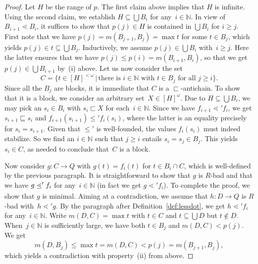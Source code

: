 \documentclass{amsart}
\numberwithin{theorem}{section}
\theoremstyle{definition}
\newcommand\ledot{\mathrel{\ensurestackMath{%
  \stackengine{-.5ex}{\lessdot}{-}{U}{c}{F}{F}{S}}}}
\begin{document}
\begin{proof}
Let $H$ be the range of $p$. The first claim above implies that $H$ is infinite. Using the second claim, we establish $H\subseteq\bigcup B_i$ for any~$i\in\mathbb N$. In view of $B_{i+1}\lessdot B_i$, it suffices to show that $p(j)\in H$ is contained in $\bigcup B_i$ for $i\geq j$. First note that we have $p(j)=m(B_{j+1},B_j)=\max t$ for some $t\in B_j$, which yields $p(j)\in t\subseteq\bigcup B_j$. Inductively, we assume $p(j)\in\bigcup B_i$ with~$i\geq j$. Here the latter ensures that we have $p(j)\leq p(i)=m(B_{i+1},B_i)$, so that we get $p(j)\in\bigcup B_{i+1}$ by~(i) above. Let us now consider the set
\begin{equation*}
    C=\{t\in[H]^{<\omega}\,|\,\text{there is $i\in\mathbb N$ with $t\in B_j$ for all~$j\geq i$}\}.
\end{equation*}
Since all the $B_j$ are blocks, it is immediate that $C$ is a $\sqsubset$-antichain. To show that it is a block, we consider an arbitrary set~$X\in[H]^\omega$. Due to $H\subseteq\bigcup B_i$, we may pick an $s_i\in B_i$ with $s_i\sqsubset X$ for each~$i\in\mathbb N$. Since we have $f_{i+1}\lessdot' f_i$, we get $s_{i+1}\sqsubseteq s_i$ and $f_{i+1}(s_{i+1})\leq'f_i(s_i)$, where the latter is an equality precisely for $s_i=s_{i+1}$. Given that $\leq'$ is well-founded, the values $f_i(s_i)$ must indeed stabilize. So we find an $i\in\mathbb N$ such that $j\geq i$ entails $s_i=s_j\in B_j$. This yields $s_i\in C$, as needed to conclude that~$C$ is a block.

Now consider $g:C\to Q$ with $g(t)=f_i(t)$ for $t\in B_i\cap C$, which is well-defined by the previous paragraph. It is straightforward to show that $g$ is $R$-bad and that we have $g\ledot' f_i$ for any~$i\in\mathbb N$ (in fact we get $g\lessdot' f_i$). To complete the proof, we show that $g$ is minimal. Aiming at a contradiction, we assume that $h:D\to Q$ is $R$-bad with~$h\lessdot' g$. By the paragraph after Definition~\ref{def:lessdot}, we get $h\lessdot' f_i$ for any~$i\in\mathbb N$. Write $m(D,C)=\max t$ with $t\in C$ and $t\subseteq\bigcup D$ but $t\notin D$. When~$j\in\mathbb N$ is sufficiently large, we have both $t\in B_j$ and $m(D,C)<p(j)$. We get
\begin{equation*}
    m(D,B_j)\leq\max t=m(D,C)<p(j)=m(B_{j+1},B_j),
\end{equation*}
which yields a contradiction with property~(ii) from above.
\end{proof}



\end{document}

